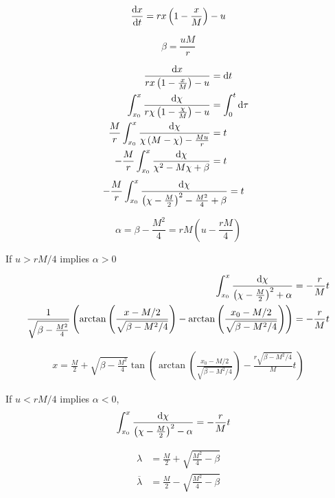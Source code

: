 \begin{equation}
\frac{\mathrm{d} x}{{\mathrm{d} t}}=rx\left(1-\frac{x}{M}\right)-u
\end{equation}

\begin{equation}
\beta=\frac{uM}{r}
\end{equation}

\begin{align*}
	\frac{\mathrm{d} x}{rx\left(1-\frac{x}{M}\right)-u}&=\mathrm{d} t \\
	\int_{x_0}^{x}\frac{\mathrm{d} \chi}{r\chi\left(1-\frac{\chi}{M}\right)-u}&=\int_{0}^{t}\mathrm{d} \tau \\
	\frac{M}{r}\int_{x_0}^{x}\frac{\mathrm{d} \chi}{\chi\left(M-\chi\right)-\frac{Mu}{r}}&=t \\
	-\frac{M}{r}\int_{x_0}^{x}\frac{\mathrm{d} \chi}{\chi^2-M\chi+\beta}&=t 
	\end{align*}
\begin{align}
	-\frac{M}{r}\int_{x_0}^{x}\frac{\mathrm{d} \chi}{\left(\chi-\frac{M}{2}\right)^2-\frac{M^2}{4}+\beta}&=t
\end{align}


\begin{equation}
	\alpha = \beta - \frac{M^2}{4} = rM\left(u-\frac{rM}{4}\right)
\end{equation}


If $u>rM/4$ implies $\alpha>0$

\begin{align*}
\int_{x_0}^{x}\frac{\mathrm{d} \chi}{\left(\chi-\frac{M}{2}\right)^2+\alpha}&=-\frac{r}{M}t \\
\frac{1}{\sqrt{\beta-\frac{M^2}{4}}}\left(\arctan\left(\frac{x-M/2}{\sqrt{\beta-M^2/4}}\right)-\arctan\left(\frac{x_0-M/2}{\sqrt{\beta-M^2/4}}\right)\right)&=-\frac{r}{M}t \\
\end{align*}

\begin{align}
	x=\frac{M}{2}+\sqrt{\beta-\frac{M^2}{4}} \tan \left(\arctan\left(\frac{x_0-M/2}{\sqrt{\beta-M^2/4}}\right)-\frac{r\sqrt{\beta-M^2/4}}{M}t\right)
\end{align}


If $u<rM/4$ implies $\alpha<0$,
\begin{align*}
	\int_{x_0}^{x}\frac{\mathrm{d} \chi}{\left(\chi-\frac{M}{2}\right)^2-\alpha} &=-\frac{r}{M}t
\end{align*}

\begin{equation}
	\begin{array}{cc}
	\lambda&=\frac{M}{2}+\sqrt{\frac{M^2}{4}-\beta} \\
	\overline{\lambda}&=\frac{M}{2}-\sqrt{\frac{M^2}{4}-\beta} \\
	\end{array}
\end{equation}

